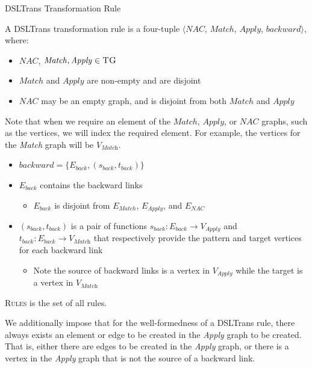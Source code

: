 \begin{definition}{DSLTrans Transformation Rule\\}
\label{def:transformation_rule}

A DSLTrans transformation rule is a four-tuple $\big\langle \mathit{NAC}$, $\mathit{Match}$, $\mathit{Apply}$, $\mathit{backward}\big\rangle$, where:

\begin{itemize}
\item $\mathit{NAC}$, $\mathit{Match}, \mathit{Apply} \in \textsc{TG}$
\item $\mathit{Match}$ and $\mathit{Apply} $ are non-empty and are disjoint
\item $\mathit{NAC}$ may be an empty graph, and is disjoint from both $\mathit{Match}$ and $\mathit{Apply} $

\end{itemize}  

Note that when we require an element of the $\mathit{Match}$, $\mathit{Apply}$, or $\mathit{NAC}$ graphs, such as the vertices, we will index the required element. For example, the vertices for the \textit{Match} graph will be $V_{\textit{Match}}$.

\begin{itemize}
\item $\mathit{backward} = \{E_{back}, (s_{back}, t_{back})\}$
\item $E_{back}$ contains the backward links
\begin{itemize}
\item $E_{back} $ is disjoint from $E_{Match}$,  $E_{Apply}$, and $E_{NAC}$
\end{itemize}
\item $(s_{back}, t_{back})$ is a pair of functions $s_{back}: E_{back}\rightarrow V_{\textit{Apply}}$ and $t_{back}: E_{back}\rightarrow V_{\textit{Match}}$ that respectively provide the pattern and target vertices for each backward link
\begin{itemize}
\item Note the source of backward links is a vertex in $V_{\textit{Apply}}$ while the target is a vertex in $V_{\textit{Match}}$
\end{itemize}
\end{itemize}

\textsc{Rules} is the set of all rules.

\end{definition}

We additionally impose that for the well-formedness of a DSLTrans rule, there always exists an element or edge to be created in the \textit{Apply} graph to be created. That is, either there are edges to be created in the \textit{Apply} graph, or there is a vertex in the \textit{Apply} graph that is not the source of a backward link.

